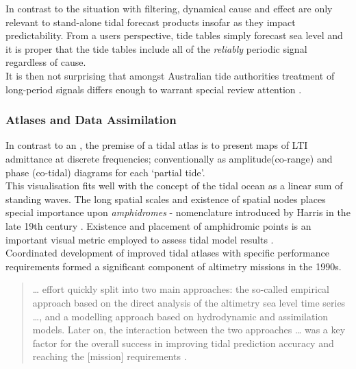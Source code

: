 In contrast to the situation with filtering, dynamical cause and effect are only relevant to stand-alone tidal forecast products insofar as they impact predictability. 
From a users perspective, tide tables simply forecast sea level and it is proper that the tide tables include all of the \emph{reliably} periodic signal regardless of cause.  \\
It is then not surprising that amongst Australian tide authorities treatment of long-period signals differs enough to warrant special review attention \citep{MHL:2013perscomm}.


\subsubsection{Atlases and Data Assimilation}

In contrast to an \OGCM{}, the premise of a tidal atlas is to present maps of LTI admittance at discrete frequencies; conventionally as amplitude(co-range) and phase (co-tidal) diagrams for each `partial tide'. \\
This visualisation fits well with the concept of the tidal ocean as a linear sum of standing waves.   The long spatial scales and existence of spatial nodes places special importance upon \emph{amphidromes} - nomenclature introduced by Harris in the late 19th century \cite[pp 119]{Cartwright:2000tt}.  
Existence and placement of amphidromic points is an important visual metric employed to assess tidal model results \citep{foreman:2012perscomm}.  \\




Coordinated development of improved tidal atlases with specific performance requirements formed a significant component of altimetry missions in the 1990s.
\begin{quotation}
\dots{} effort quickly split into two main approaches: the so-called empirical approach based on the direct analysis of the altimetry sea level time series \dots{}, and a modelling approach based on hydrodynamic and assimilation models. Later on, the interaction between the two approaches \dots{} was a key factor for the overall success in improving tidal prediction accuracy and reaching the [mission] requirements \cite[pp394]{Lefevre:2011dg}.
\end{quotation}

